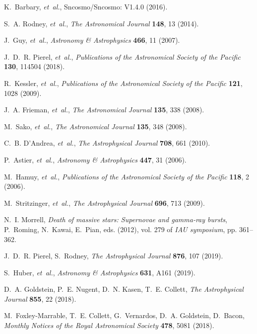\documentclass[12pt]{article}
\begin{document}
\begin{thebibliography}{10}
K.~Barbary, {\it et~al.\/}, Sncosmo/{Sncosmo}: {V1}.4.0 (2016).

S.~A. Rodney, {\it et~al.\/}, {\it The Astronomical Journal\/} {\bf 148}, 13
  (2014).

J.~Guy, {\it et~al.\/}, {\it Astronomy \& Astrophysics\/} {\bf 466}, 11 (2007).

J.~D.~R. Pierel, {\it et~al.\/}, {\it Publications of the Astronomical Society
  of the Pacific\/} {\bf 130}, 114504 (2018).

R.~Kessler, {\it et~al.\/}, {\it Publications of the Astronomical Society of
  the Pacific\/} {\bf 121}, 1028 (2009).

J.~A. Frieman, {\it et~al.\/}, {\it The Astronomical Journal\/} {\bf 135}, 338
  (2008).

M.~Sako, {\it et~al.\/}, {\it The Astronomical Journal\/} {\bf 135}, 348
  (2008).

C.~B. D'Andrea, {\it et~al.\/}, {\it The Astrophysical Journal\/} {\bf 708},
  661 (2010).

P.~Astier, {\it et~al.\/}, {\it Astronomy \& Astrophysics\/} {\bf 447}, 31
  (2006).

M.~Hamuy, {\it et~al.\/}, {\it Publications of the Astronomical Society of the
  Pacific\/} {\bf 118}, 2 (2006).

M.~Stritzinger, {\it et~al.\/}, {\it The Astrophysical Journal\/} {\bf 696},
  713 (2009).

N.~I. Morrell, {\it Death of massive stars: {Supernovae} and gamma-ray
  bursts\/}, P.~Roming, N.~Kawai, E.~Pian, eds. (2012), vol. 279 of {\it {IAU}
  symposium\/}, pp. 361--362.

J.~D.~R. Pierel, S.~Rodney, {\it The Astrophysical Journal\/} {\bf 876}, 107
  (2019).

S.~Huber, {\it et~al.\/}, {\it Astronomy \& Astrophysics\/} {\bf 631}, A161
  (2019).

D.~A. Goldstein, P.~E. Nugent, D.~N. Kasen, T.~E. Collett, {\it The
  Astrophysical Journal\/} {\bf 855}, 22 (2018).

M.~Foxley-Marrable, T.~E. Collett, G.~Vernardos, D.~A. Goldstein, D.~Bacon,
  {\it Monthly Notices of the Royal Astronomical Society\/} {\bf 478}, 5081
  (2018).


\end{thebibliography}
\end{document}
